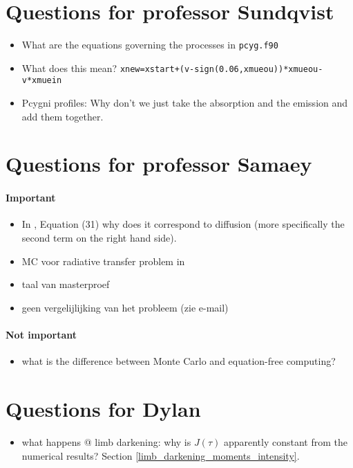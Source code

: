 \documentclass[../main/main.tex]{subfiles}
\begin{document}
\section{Questions for professor Sundqvist}
\begin{itemize}
\item What are the equations governing the processes in \texttt{pcyg.f90} 

\item What does this mean? \texttt{xnew=xstart+(v-sign(0.06,xmueou))*xmueou-v*xmuein}

\item Pcygni profiles: Why don't we just take the absorption and the emission and add them together.
\end{itemize}

\section{Questions for professor Samaey}
\paragraph{Important}
\begin{itemize}
\item In \cite{Dimarco2018}, Equation (31) why does it correspond to diffusion (more specifically the second term on the right hand side).
\item MC voor radiative transfer problem in \cite{Dimarco2018}
\item taal van masterproef
\item geen vergelijlijking van het probleem (zie e-mail)
\end{itemize}

\paragraph{Not important}
\begin{itemize}
\item what is the difference between Monte Carlo and equation-free computing?
\end{itemize}

\newpage
\section{Questions for Dylan}
\begin{itemize}
\item what happens @ limb darkening: why is $J(\tau)$ apparently constant from the numerical results? Section \ref{limb_darkening_moments_intensity}.
\end{itemize}
\end{document}
